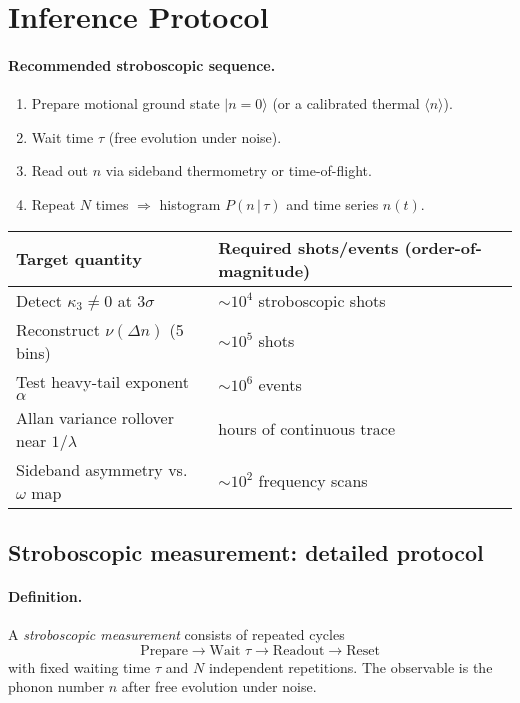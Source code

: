 \section{Inference Protocol}
\label{sec:inference-protocol}
\paragraph{Recommended stroboscopic sequence.}
\begin{enumerate}\itemsep0.2em
  \item Prepare motional ground state $\lvert n=0\rangle$ (or a calibrated thermal $\langle n\rangle$).
  \item Wait time $\tau$ (free evolution under noise).
  \item Read out $n$ via sideband thermometry or time-of-flight.
  \item Repeat $N$ times $\Rightarrow$ histogram $P(n\,|\,\tau)$ and time series $n(t)$.
\end{enumerate}

\begin{table}[h]
  \centering
  \renewcommand{\arraystretch}{1.15}
  \begin{tabularx}{0.9\textwidth}{>{\raggedright\arraybackslash}X>{\raggedleft\arraybackslash}p{4.2cm}}
    \hline
    \textbf{Target quantity} & \textbf{Required shots/events (order-of-magnitude)} \\
    \hline
    Detect $\kappa_3 \neq 0$ at $3\sigma$ & $\sim 10^4$ stroboscopic shots \\
    Reconstruct $\nu(\Delta n)$ (5 bins)  & $\sim 10^5$ shots \\
    Test heavy-tail exponent $\alpha$      & $\sim 10^6$ events \\
    Allan variance rollover near $1/\lambda$ & hours of continuous trace \\
    Sideband asymmetry vs.\ $\omega$ map   & $\sim 10^2$ frequency scans \\
    \hline
  \end{tabularx}
\end{table}

\subsection{Stroboscopic measurement: detailed protocol}
\paragraph{Definition.}
A \emph{stroboscopic measurement} consists of repeated cycles
\[
  \text{Prepare} \to \text{Wait } \tau \to \text{Readout} \to \text{Reset}
\]
with fixed waiting time $\tau$ and $N$ independent repetitions.
The observable is the phonon number $n$ after free evolution under noise.

